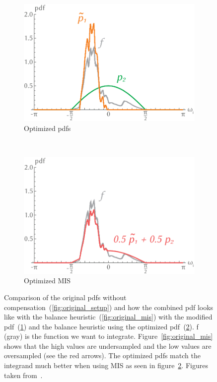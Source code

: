 \begin{figure}[h]
\begin{subfigure}[b]{.3\textwidth}
        \includegraphics[width=\textwidth]{images/optimized_setup.png}
        \caption{Optimized pdfs
        \label{fig:optimized_setup}}
    \end{subfigure}
    ~
    \begin{subfigure}[b]{.3\textwidth}
        \centering
        \includegraphics[width=\textwidth]{images/mis_optimized.png}
        \caption{Optimized MIS}
        \label{fig:optimized_mis}
    \end{subfigure}
    \caption{Comparison of the original pdfs without compensation~(\ref{fig:original_setup})
    and how the combined pdf looks like with the balance heuristic~(\ref{fig:original_mis})
    with the modified pdf~(\ref{fig:optimized_setup}) and the balance heuristic using the optimized pdf~(\ref{fig:optimized_mis}).
    f (gray) is the function we want to integrate.
    Figure~\ref{fig:original_mis} shows that the high values are undersampled and the low values are oversampled (see the red arrows).
    The optimized pdfs match the integrand much better when using MIS as seen in figure~\ref{fig:optimized_mis}.
    Figures taken from~\cite[Figure~2]{Karlik2019}.}
    \label{fig:pdf_comparison}
\end{figure}

